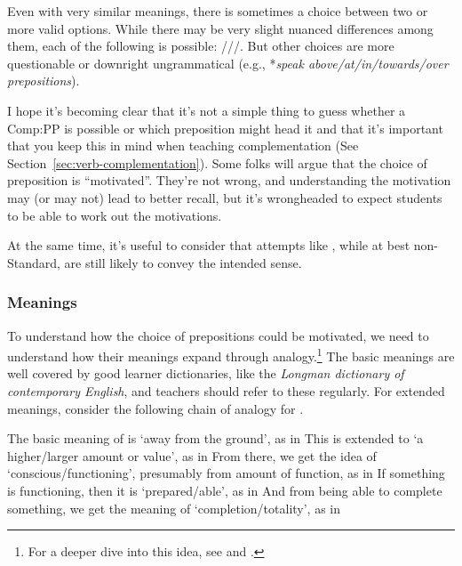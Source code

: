 Even with very similar meanings, there is sometimes a choice between two or more valid options. While there may be very slight nuanced differences among
them, each of the following is possible: ///. But
other choices are more questionable or downright ungrammatical (e.g., *\textit{speak
above/at/in/towards/over prepositions}).

I hope it's becoming clear that it's not a simple thing to guess whether a Comp:PP is possible or which preposition might head it and that it's important
that you keep this in mind when teaching complementation (See Section~\ref{sec:verb-complementation}). Some folks will argue that the choice of preposition is ``motivated''. They're not
wrong, and understanding the motivation may (or may not) lead to better recall,
but it's wrongheaded to expect students to be able to work out the motivations.

At the same time, it's useful to consider that attempts like , while at best non-Standard, are still likely to convey the intended sense.

\subsubsection*{Meanings} \label{sec:preposition-meanings}

To understand how the choice of prepositions could be motivated, we need to
understand how their meanings expand through analogy.\footnote{For a deeper dive into this idea, see \citet{lakoff1980} and \citet{tyler2003}.} The basic meanings
are well covered by good learner dictionaries, like the \textit{Longman dictionary of
contemporary English}, and teachers should refer to these regularly. For extended
meanings, consider the following chain of analogy for .

The basic meaning of  is `away from the ground', as in 
This is extended to `a higher/larger amount or value', as in 
From there, we get the idea of `conscious/functioning', presumably from amount
of function, as in  If something is functioning, then it is
`prepared/able', as in  And from being able to complete
something, we get the meaning of `completion/totality', as in 

